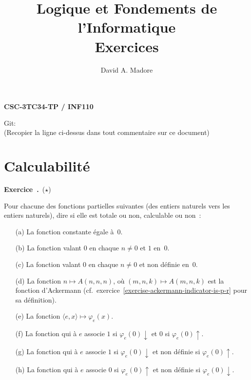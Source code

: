 \documentclass[12pt,a4paper]{article}
\theoremstyle{definition}
\newcommand\exercice{%
\refstepcounter{comcnt}\bigskip\noindent\textbf{Exercice~\thecomcnt.}}
\newif\ifcorrige
\begin{document}
\ifcorrige
\title{Logique et Fondements de l'Informatique\\Exercices corrigés}
\else
\title{Logique et Fondements de l'Informatique\\Exercices}
\fi
\author{David A. Madore}
\maketitle

\centerline{\textbf{CSC-3TC34-TP / INF110}}

\vskip2cm

{\footnotesize
\immediate{}
\begin{center}
Git: 
\\
(Recopier la ligne ci-dessus dans tout commentaire sur ce document)
\end{center}
\immediate{}
\par}



%
%
%

\section{Calculabilité}


\setcounter{comcnt}{-1}\exercice\ (${\star}$)\par\nobreak

Pour chacune des fonctions partielles suivantes (des entiers naturels
vers les entiers naturels), dire si elle est totale ou non, calculable
ou non :
\begin{itemize}
\item[(a)] La fonction constante égale à $0$.
\item[(b)] La fonction valant $0$ en chaque $n\neq 0$ et $1$ en $0$.
\item[(c)] La fonction valant $0$ en chaque $n\neq 0$ et non définie
  en $0$.
\item[(d)] La fonction $n \mapsto A(n,n,n)$, où $(m,n,k) \mapsto
  A(m,n,k)$ est la fonction d'Ackermann
  (cf. exercice \ref{exercise-ackermann-indicator-is-p-r} pour sa
  définition).
\item[(e)] La fonction $\langle e,x\rangle \mapsto \varphi_e(x)$.
\item[(f)] La fonction qui à $e$ associe $1$ si
  $\varphi_e(0)\downarrow$ et $0$ si $\varphi_e(0)\uparrow$.
\item[(g)] La fonction qui à $e$ associe $1$ si
  $\varphi_e(0)\downarrow$ et non définie si $\varphi_e(0)\uparrow$.
\item[(h)] La fonction qui à $e$ associe $0$ si $\varphi_e(0)\uparrow$
  et non définie si $\varphi_e(0)\downarrow$.
\end{itemize}
\end{document}
